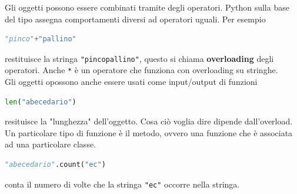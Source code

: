 \documentclass[11pt]{scrartcl}
\begin{document}
	Gli oggetti possono essere combinati tramite degli operatori. Python sulla base del tipo assegna comportamenti diversi ad operatori uguali. Per esempio
	\begin{lstlisting}[language=Python]
		"pinco"+"pallino"
	\end{lstlisting}
	restituisce la stringa \verb*|"pincopallino"|, questo si chiama \textbf{overloading} degli operatori. Anche \verb*|*| è un operatore che funziona con overloading su stringhe. \\
	Gli oggetti opossono anche essere usati come input/output di funzioni
	\begin{lstlisting}[language=Python]
		len("abecedario")
	\end{lstlisting}
	resituisce la "lunghezza" dell'oggetto. Cosa ciò voglia dire dipende dall'overload. Un particolare tipo di funzione è il metodo, ovvero una funzione che è associata ad una particolare classe.
	\begin{lstlisting}[language=Python]
		"abecedario".count("ec")
	\end{lstlisting}
	conta il numero di volte che la stringa \verb*|"ec"| occorre nella stringa. 
\end{document}
